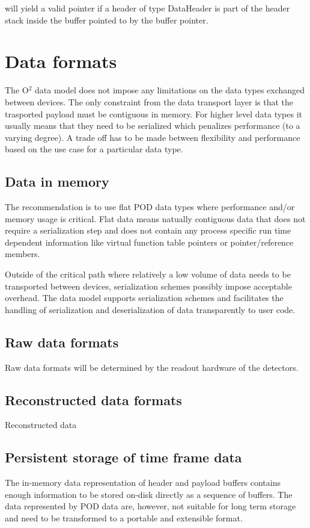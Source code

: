 \documentclass[a4paper,twoside]{article}
\def\O2{O$^2$}
\begin{document}
will yield a valid pointer if a header of type DataHeader is part of the header stack inside the buffer pointed to by the buffer pointer.

\section{Data formats}

The \O2 data model does not impose any limitations on the data types exchanged between devices. The only constraint from the data transport layer is that the trasported payload must be contiguous in memory. For higher level data types it usually means that they need to be serialized which penalizes performance (to a varying degree). A trade off has to be made between flexibility and performance based on the use case for a particular data type.

\subsection{Data in memory}
The recommendation is to use flat POD data types where performance and/or memory usage is critical. Flat data means natually contiguous data that does not require a serialization step and does not contain any process specific run time dependent information like virtual function table pointers or pointer/reference members.

Outside of the critical path where relatively a low volume of data needs to be transported between devices, serialization schemes possibly impose acceptable overhead. The data model supports serialization schemes and facilitates the handling of serialization and deserialization of data transparently to user code.

\subsection{Raw data formats}
Raw data formats will be determined by the readout hardware of the detectors.

\subsection{Reconstructed data formats}
Reconstructed data 

\subsection{Persistent storage of time frame data}
The in-memory data representation of header and payload buffers contains enough information to be stored on-disk directly as a sequence of buffers. The data represented by POD data are, however, not suitable for long term storage and need to be transformed to a portable and extensible format.
\end{document}
